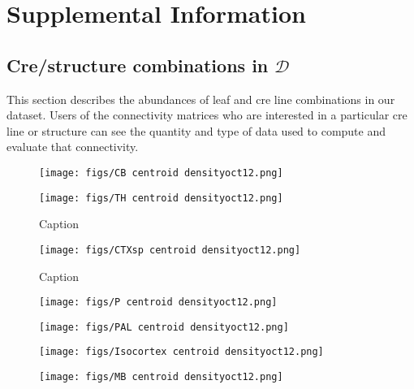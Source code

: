 \section{Supplemental Information}
\label{supp_sec:info}

\subsection{Cre/structure combinations in $\mathcal D$}
\label{supp_sec:data}

This section describes the abundances of leaf and cre line combinations in our dataset.
Users of the connectivity matrices who are interested in a particular cre line or structure can see the quantity and type of data used to compute and evaluate that connectivity.

\newpage

\begin{figure}[H]
    \centering
    \texttt{[image: figs/CB centroid densityoct12.png]}
    \label{fig:my_label}
\end{figure}
\newpage

\begin{figure}[H]
    \centering
    \texttt{[image: figs/TH centroid densityoct12.png]}
    \caption{Caption}
    \label{fig:my_label}
\end{figure}
\newpage

\begin{figure}[H]
    \centering
    \texttt{[image: figs/CTXsp centroid densityoct12.png]}
    \caption{Caption}
    \label{fig:my_label}
\end{figure}
\newpage

\begin{figure}[H]
    \centering
    \texttt{[image: figs/P centroid densityoct12.png]}
    \label{fig:my_label}
\end{figure}
\newpage

\begin{figure}[H]
    \centering
    \texttt{[image: figs/PAL centroid densityoct12.png]} 
    \label{fig:my_label}
\end{figure}
\newpage

\begin{figure}[H]
    \centering
    \texttt{[image: figs/Isocortex centroid densityoct12.png]}
    \label{fig:iso_count}
\end{figure}
\newpage

\begin{figure}[H]
    \centering
    \texttt{[image: figs/MB centroid densityoct12.png]} 
    \label{fig:my_label}
\end{figure}
\newpage

